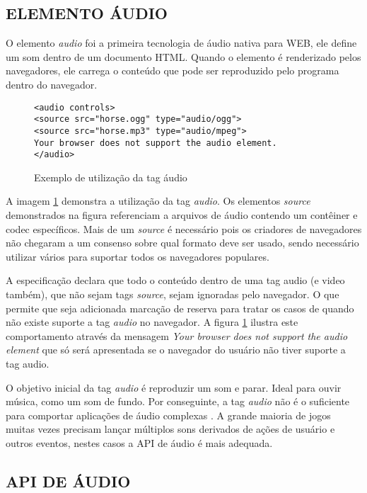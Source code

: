 \subsection{ELEMENTO ÁUDIO}

O elemento \textit{audio} foi a primeira tecnologia de áudio nativa para
WEB, ele define um som dentro de um documento HTML. Quando o elemento
é renderizado pelos navegadores, ele carrega o conteúdo que pode ser
reproduzido pelo programa dentro do navegador.

\begin{figure}
\centering
\begin{verbatim}
<audio controls>
<source src="horse.ogg" type="audio/ogg">
<source src="horse.mp3" type="audio/mpeg">
Your browser does not support the audio element.
</audio>
\end{verbatim}
\caption{Exemplo de utilização da tag áudio}
\label{fig:htmlAudio}
\end{figure}

A imagem \ref{fig:htmlAudio} demonstra a utilização da tag
\textit{audio}. Os elementos \textit{source} demonstrados na figura
referenciam a arquivos de áudio contendo um contêiner e codec
específicos. Mais de um \textit{source } é necessário pois 
os criadores de navegadores não chegaram a um consenso sobre 
qual formato deve ser usado, sendo necessário utilizar vários para suportar
todos os navegadores populares.

A especificação declara que todo o conteúdo dentro de uma tag audio
(e video também), que não sejam tags \textit{source}, sejam ignoradas
pelo navegador. O que permite que seja adicionada marcação de reserva
para tratar os casos de quando não existe suporte a tag \textit{audio}
no navegador. A figura \ref{fig:htmlAudio} ilustra este comportamento 
através da mensagem \textit{Your browser does not support the audio element
} que só será apresentada se o navegador do usuário não tiver suporte
a tag audio.

O objetivo inicial da tag \textit{audio} é reproduzir um som e parar.
Ideal para ouvir música, como um som de fundo. Por conseguinte, a tag
\textit{audio} não é o suficiente para comportar aplicações de
áudio complexas \autocite{audioApiSpec}. A grande maioria de jogos
muitas vezes precisam lançar múltiplos sons derivados de ações
de usuário e outros eventos, nestes casos a API de áudio é mais
adequada.

\subsection{API DE ÁUDIO}

